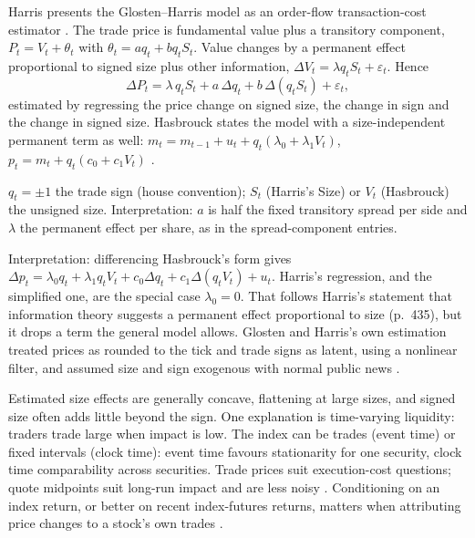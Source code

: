 \begin{qfmethod}\label{meth:order-flow-impact-regression}
 Harris presents the Glosten--Harris model as an order-flow transaction-cost estimator \citep[chap.~``Liquidity and Transaction Cost Measurement'', box, p.~435]{alpha-harris}. The trade price is fundamental value plus a transitory component, $P_t=V_t+\theta_t$ with $\theta_t=aq_t+bq_tS_t$. Value changes by a permanent effect proportional to signed size plus other information, $\Delta V_t=\lambda q_tS_t+\varepsilon_t$. Hence
\[ \Delta P_t=\lambda\,q_tS_t+a\,\Delta q_t+b\,\Delta(q_tS_t)+\varepsilon_t, \]
estimated by regressing the price change on signed size, the change in sign and the change in signed size. Hasbrouck states the model with a size-independent permanent term as well: $m_t=m_{t-1}+u_t+q_t(\lambda_0+\lambda_1V_t)$, $p_t=m_t+q_t(c_0+c_1V_t)$ \citep[sec.~9.8.1, eq.~(9.26), p.~91]{s6-hasbrouck}.

 $q_t=\pm1$ the trade sign (house convention); $S_t$ (Harris's Size) or $V_t$ (Hasbrouck) the unsigned size. Interpretation: $a$ is half the fixed transitory spread per side and $\lambda$ the permanent effect per share, as in the spread-component entries.

 Interpretation: differencing Hasbrouck's form gives $\Delta p_t=\lambda_0q_t+\lambda_1q_tV_t+c_0\Delta q_t+c_1\Delta(q_tV_t)+u_t$. Harris's regression, and the simplified one, are the special case $\lambda_0=0$. That follows Harris's statement that information theory suggests a permanent effect proportional to size (p.~435), but it drops a term the general model allows. Glosten and Harris's own estimation treated prices as rounded to the tick and trade signs as latent, using a nonlinear filter, and assumed size and sign exogenous with normal public news \citep[sec.~9.8.1, pp.~91--92]{s6-hasbrouck}.

 Estimated size effects are generally concave, flattening at large sizes, and signed size often adds little beyond the sign. One explanation is time-varying liquidity: traders trade large when impact is low. The index can be trades (event time) or fixed intervals (clock time): event time favours stationarity for one security, clock time comparability across securities. Trade prices suit execution-cost questions; quote midpoints suit long-run impact and are less noisy \citep[secs.~9.7.2--9.7.4, pp.~89--91]{s6-hasbrouck}. Conditioning on an index return, or better on recent index-futures returns, matters when attributing price changes to a stock's own trades \citep[sec.~9.6, p.~87]{s6-hasbrouck}.


\end{qfmethod}
